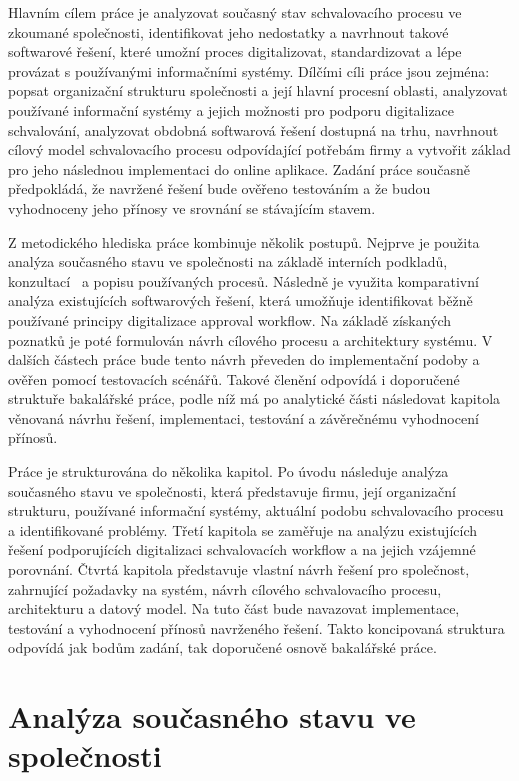 Hlavním cílem práce je analyzovat současný stav schvalovacího procesu ve zkoumané společnosti, identifikovat jeho nedostatky a navrhnout takové softwarové řešení, které umožní proces digitalizovat, standardizovat a lépe provázat s používanými informačními systémy. Dílčími cíli práce jsou zejména: popsat organizační strukturu společnosti a její hlavní procesní oblasti, analyzovat používané informační systémy a jejich možnosti pro podporu digitalizace schvalování, analyzovat obdobná softwarová řešení dostupná na trhu, navrhnout cílový model schvalovacího procesu odpovídající potřebám firmy a vytvořit základ pro jeho následnou implementaci do online aplikace. Zadání práce současně předpokládá, že navržené řešení bude ověřeno testováním a že budou vyhodnoceny jeho přínosy ve srovnání se stávajícím stavem.

Z metodického hlediska práce kombinuje několik postupů. Nejprve je použita analýza současného stavu ve společnosti na základě interních podkladů, konzultací~\cite{ref6} a popisu používaných procesů. Následně je využita komparativní analýza existujících softwarových řešení, která umožňuje identifikovat běžně používané principy digitalizace approval workflow. Na základě získaných poznatků je poté formulován návrh cílového procesu a architektury systému. V dalších částech práce bude tento návrh převeden do implementační podoby a ověřen pomocí testovacích scénářů. Takové členění odpovídá i doporučené struktuře bakalářské práce, podle níž má po analytické části následovat kapitola věnovaná návrhu řešení, implementaci, testování a závěrečnému vyhodnocení přínosů.

Práce je strukturována do několika kapitol. Po úvodu následuje analýza současného stavu ve společnosti, která představuje firmu, její organizační strukturu, používané informační systémy, aktuální podobu schvalovacího procesu a identifikované problémy. Třetí kapitola se zaměřuje na analýzu existujících řešení podporujících digitalizaci schvalovacích workflow a na jejich vzájemné porovnání. Čtvrtá kapitola představuje vlastní návrh řešení pro společnost, zahrnující požadavky na systém, návrh cílového schvalovacího procesu, architekturu a datový model. Na tuto část bude navazovat implementace, testování a vyhodnocení přínosů navrženého řešení. Takto koncipovaná struktura odpovídá jak bodům zadání, tak doporučené osnově bakalářské práce.


\chapter{Analýza současného stavu ve společnosti}


